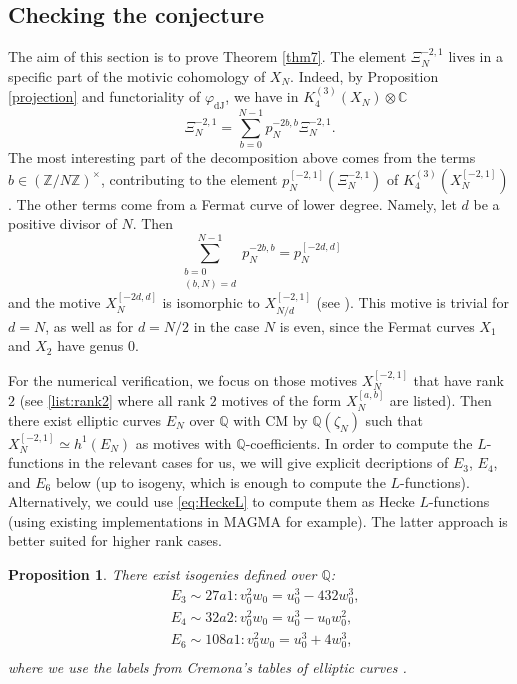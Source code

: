 \documentclass[11pt,a4,leqno]{amsart}
\theoremstyle{my theoremstyle}
\newtheorem{prop}[thm]{Proposition}
\theoremstyle{dfn}
\theoremstyle{remark}
\renewcommand{\1}{\mathbbm{1}}
\newcommand{\Z}{\mathbb{Z}}
\newcommand{\Q}{\mathbb{Q}}
\newcommand{\C}{\mathbb{C}}
\newcommand{\z}{\zeta}
\numberwithin{equation}{section}
\begin{document}
\subsection{Checking the conjecture} \label{subsec:conjnum}

The aim of this section is to prove Theorem \ref{thm7}.
The element $\Xi_N^{-2,1}$ lives in a specific part of the motivic cohomology of $X_N$. Indeed, by Proposition \ref{projection} and functoriality of $\varphi_{\mathrm{dJ}}$, we have in $K_4^{(3)}(X_N) \otimes \C$
\begin{equation*}
    \Xi_N^{-2,1} = \sum_{b=0}^{N-1} p_N^{-2b,b} \Xi_N^{-2,1}.
\end{equation*}
The most interesting part of the decomposition above comes from the terms $b \in (\Z/N\Z)^\times$, contributing to the element $p_N^{[-2,1]}(\Xi_N^{-2,1})$ of $K_4^{(3)}(X_N^{[-2,1]})$. The other terms come from a Fermat curve of lower degree. Namely, let $d$ be a positive divisor of $N$. Then
\begin{equation*}
    \sum_{\substack{b = 0 \\ (b,N)=d}}^{N-1} p_N^{-2b,b} = p_N^{[-2d, d]}
\end{equation*}
and the motive $X_N^{[-2d,d]}$ is isomorphic to $X_{N/d}^{[-2,1]}$ (see \cite[(2.3)]{Ots15}). This motive is trivial for $d=N$, as well as for $d=N/2$ in the case $N$ is even, since the Fermat curves $X_1$ and $X_2$ have genus $0$.

    For the numerical verification, we focus on those motives $X_N^{[-2,1]}$ that have rank $2$ (see \eqref{list:rank2} where all rank $2$ motives of the form $X_N^{[a,b]}$ are listed). 
    Then there exist elliptic curves $E_{N}$ over $\Q$ with CM by $\Q(\z_N)$ such that $X_N^{[-2,1]}\simeq h^1(E_N)$ as motives with $\Q$-coefficients. 
    In order to compute the $L$-functions in the relevant cases for us, we will give explicit decriptions of $E_3$, $E_4$, and $E_6$ below (up to isogeny, which is enough to compute the $L$-functions). Alternatively, we could use \eqref{eq:HeckeL} to compute them as Hecke $L$-functions (using existing implementations in MAGMA \cite{Magma} for example). The latter approach is better suited for higher rank cases. 


\begin{prop} \label{elliptic_curve_isom}    
    There exist isogenies defined over $\Q$: 
    \begin{align*}
        & E_3 \sim 27a1  : v_0^2w_0=u_0^3-432 w_0^3,\\
        & E_4 \sim 32a2  : v_0^2w_0=u_0^3 - u_0w_0^2,\\
        & E_6 \sim 108a1  : v_0^2w_0= u_0^3+4w_0^3, \\
    \end{align*}
    where we use the labels from Cremona's tables of elliptic curves \cite{Cre97}.
\end{prop}
\end{document}
